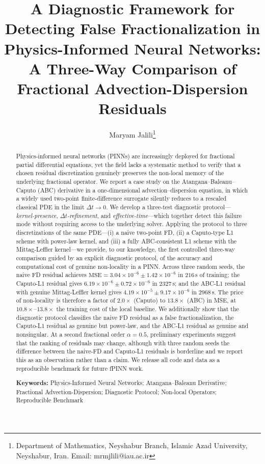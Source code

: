 \documentclass[11pt]{article}
\title{\textbf{A Diagnostic Framework for Detecting False Fractionalization in Physics-Informed Neural Networks: \\ A Three-Way Comparison of Fractional Advection-Dispersion Residuals}}
\author{Maryam Jalili\thanks{Department of Mathematics, Neyshabur Branch, Islamic Azad University, Neyshabur, Iran. Email: mrmjlili@iau.ac.ir}}
\date{}
\begin{document}
\maketitle

\begin{abstract}
\noindent
Physics-informed neural networks (PINNs) are increasingly deployed for fractional partial differential equations, yet the field lacks a systematic method to verify that a chosen residual discretization genuinely preserves the non-local memory of the underlying fractional operator. We report a case study on the Atangana--Baleanu--Caputo (ABC) derivative in a one-dimensional advection--dispersion equation, in which a widely used two-point finite-difference surrogate silently reduces to a rescaled classical PDE in the limit \(\Delta t \to 0\). We develop a three-test diagnostic protocol---\emph{kernel-presence}, \emph{\(\Delta t\)-refinement}, and \emph{effective-time}---which together detect this failure mode without requiring access to the underlying solver. Applying the protocol to three discretizations of the same PDE---(i) a naive two-point FD, (ii) a Caputo-type L1 scheme with power-law kernel, and (iii) a fully ABC-consistent L1 scheme with the Mittag-Leffler kernel---we provide, to our knowledge, the first controlled three-way comparison guided by an explicit diagnostic protocol, of the accuracy and computational cost of genuine non-locality in a PINN. Across three random seeds, the naive FD residual achieves \(\mathrm{MSE} = 3.04 \times 10^{-6} \pm 1.42 \times 10^{-6}\) in \(216\)\,s of training; the Caputo-L1 residual gives \(6.19 \times 10^{-6} \pm 0.72 \times 10^{-6}\) in \(2327\)\,s; and the ABC-L1 residual with genuine Mittag-Leffler kernel gives \(4.19 \times 10^{-5} \pm 9.17 \times 10^{-6}\) in \(2968\)\,s. The price of non-locality is therefore a factor of \(2.0\times\) (Caputo) to \(13.8\times\) (ABC) in MSE, at \(10.8\times\)--\(13.8\times\) the training cost of the local baseline. We additionally show that the diagnostic protocol classifies the naive FD residual as a false fractionalization, the Caputo-L1 residual as genuine but power-law, and the ABC-L1 residual as genuine and nonsingular. At a second fractional order \(\alpha = 0.5\), preliminary experiments suggest that the ranking of residuals may change, although with three random seeds the difference between the naive-FD and Caputo-L1 residuals is borderline and we report this as an observation rather than a claim. We release all code and data as a reproducible benchmark for future fPINN work.

\vspace{0.5cm}
\noindent\textbf{Keywords:} Physics-Informed Neural Networks; Atangana--Baleanu Derivative; Fractional Advection-Dispersion; Diagnostic Protocol; Non-local Operators; Reproducible Benchmark
\end{abstract}
\end{document}
